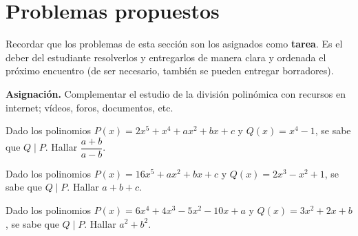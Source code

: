 \section{Problemas propuestos}

Recordar que los problemas de esta sección son los asignados como \textbf{tarea}.
Es el deber del estudiante resolverlos y entregarlos de manera clara y ordenada el próximo encuentro
(de ser necesario, también se pueden entregar borradores).

\textbf{Asignación. } Complementar el estudio de la división polinómica con recursos en internet; vídeos, foros, documentos, etc.

\begin{section-problem}
    Dado los polinomios $P(x) = 2x^5 + x^4 + ax^2 + bx + c$ y $Q(x) = x^4 - 1$, se sabe que $Q \mid P$. Hallar $\dfrac{a + b}{a - b}$.
\end{section-problem}

\begin{section-problem} 
    Dado los polinomios $P(x) = 16x^5 + ax^2 + bx + c$ y $Q(x) = 2 x^3 - x^2 + 1$, se sabe que $Q \mid P$. Hallar $a + b + c$.
\end{section-problem}

\begin{section-problem}
    Dado los polinomios $P(x) = 6x^4 + 4x^3 - 5x^2 - 10x + a$ y $Q(x) = 3 x^2 + 2x + b$, se sabe que $Q \mid P$. Hallar $a^2 + b^2$.
\end{section-problem}